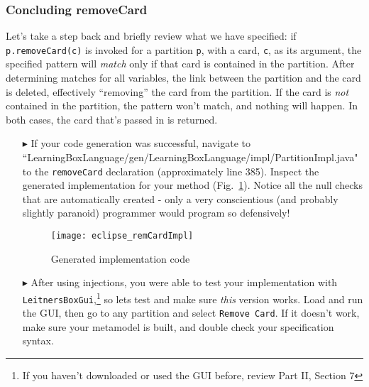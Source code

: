 \newpage
\genHeader
\hypertarget{remCard end}{}
\subsubsection{Concluding removeCard}

Let's take a step back and briefly review what we have specified:  if \texttt{p.remove\-Card(c)} is invoked for a partition \texttt{p}, with a card, \texttt{c},
as its argument, the specified pattern will \emph{match} only if that card is contained in the partition. After determining matches for all variables, the
link between the partition and the card is deleted, effectively ``removing'' the card from the partition. If the card is \emph{not} contained in the partition,
the pattern won't match, and nothing will happen. In both cases, the card that's passed in is returned.

\begin{itemize}

\item[$\blacktriangleright$] If your code generation was successful, navigate to 
``Learning\-Box\-Language/\-gen/\-Learning\-Box\-Language/\-impl/\-Partition\-Impl.java" to the \texttt{\-remove\-Card} declaration (approximately line 385).
Inspect the generated implementation for your method (Fig.~\ref{fig:remCardImpl}). Notice all the null checks that are automatically created - only a very conscientious
(and probably slightly paranoid) programmer would program so defensively!

\begin{figure}[htp]
\begin{center}
  \texttt{[image: eclipse\_remCardImpl]}
  \caption{Generated implementation code}
  \label{fig:remCardImpl}
\end{center}
\end{figure}

\item[$\blacktriangleright$] After using injections, you were able to test your implementation with \texttt{LeitnersBoxGui},\footnote{If you haven't downloaded
or used the GUI before, review Part II, Section 7} so lets test and make sure \emph{this} version works. Load and run the GUI, then go to any partition and
select \texttt{Remove Card}. If it doesn't work, make sure your metamodel is built, and double check your specification syntax.

\end{itemize}